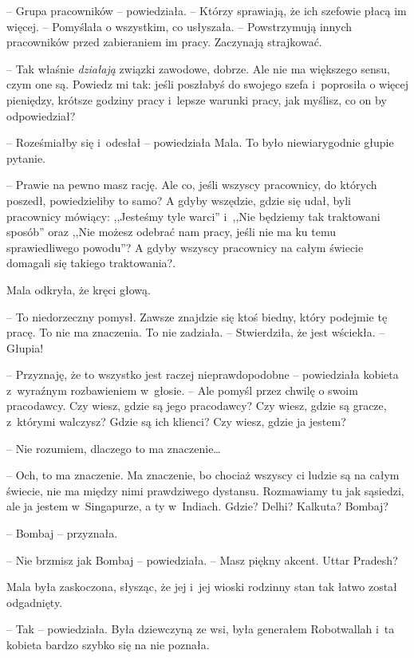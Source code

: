 \documentclass[oneside,polish,11pt,rmheadings]{mwbk}
\begin{document}
-- Grupa pracowników -- powiedziała. -- Którzy sprawiają, że ich szefowie płacą im więcej. -- Pomyślała o wszystkim, co usłyszała. -- Powstrzymują innych pracowników przed zabieraniem im pracy. Zaczynają strajkować. 


-- Tak właśnie \textit{działają} związki zawodowe, dobrze. Ale nie ma większego sensu, czym one są. Powiedz mi tak: jeśli poszłabyś do swojego szefa i~poprosiła o więcej pieniędzy, krótsze godziny pracy i~lepsze warunki pracy, jak myślisz, co on by odpowiedział? 


-- Roześmiałby się i~odesłał -- powiedziała Mala. To było niewiarygodnie głupie pytanie. 


-- Prawie na pewno masz rację. Ale co, jeśli wszyscy pracownicy, do których poszedł, powiedzieliby to samo? A gdyby wszędzie, gdzie się udał, byli pracownicy mówiący: ,,Jesteśmy tyle warci'' i~,,Nie będziemy tak traktowani sposób'' oraz ,,Nie możesz odebrać nam pracy, jeśli nie ma ku temu sprawiedliwego powodu''? A gdyby wszyscy pracownicy na całym świecie domagali się takiego traktowania?. 


Mala odkryła, że kręci głową. 

-- To niedorzeczny pomysł. Zawsze znajdzie się ktoś biedny, który podejmie tę pracę. To nie ma znaczenia. To nie zadziała. -- Stwierdziła, że jest wściekła. -- Głupia!  


-- Przyznaję, że to wszystko jest raczej nieprawdopodobne -- powiedziała kobieta z~wyraźnym rozbawieniem w~głosie. -- Ale pomyśl przez chwilę o swoim pracodawcy. Czy wiesz, gdzie są jego pracodawcy? Czy wiesz, gdzie są gracze, z~którymi walczysz? Gdzie są ich klienci? Czy wiesz, gdzie ja jestem? 


-- Nie rozumiem, dlaczego to ma znaczenie\ldots   


-- Och, to ma znaczenie. Ma znaczenie, bo chociaż wszyscy ci ludzie są na całym świecie, nie ma między nimi prawdziwego dystansu. Rozmawiamy tu jak sąsiedzi, ale ja jestem w~Singapurze, a ty w~Indiach. Gdzie? Delhi? Kalkuta? Bombaj? 


-- Bombaj -- przyznała. 


-- Nie brzmisz jak Bombaj -- powiedziała. -- Masz piękny akcent. Uttar Pradesh? 


Mala była zaskoczona, słysząc, że jej i~jej wioski rodzinny stan tak łatwo został odgadnięty. 

-- Tak -- powiedziała. Była dziewczyną ze wsi, była generałem Robotwallah i~ta kobieta bardzo szybko się na nie poznała. 
\end{document}
